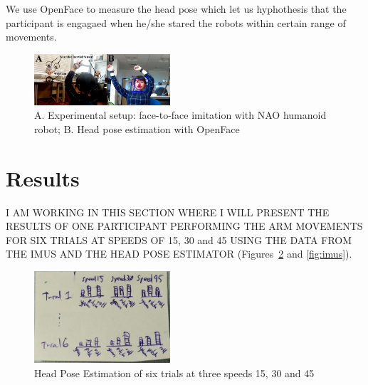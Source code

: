 \documentclass{sigchi}
\begin{document}

We use OpenFace \cite{Baltrusaitis2016} to measure the head pose which
 let us hyphothesis that the participant is engagaed
when he/she stared the robots within certain range of movements.






\begin{figure}[!htb]
\centering
\includegraphics[width=0.45\textwidth]{figures/experiment/fig_w619h233}
\caption[PA]{A. Experimental setup: face-to-face imitation with NAO humanoid robot;
B. Head pose estimation with OpenFace \cite{Baltrusaitis2016}
}
\label{fig:exp}
\end{figure}


\section{Results}
I AM WORKING IN THIS SECTION WHERE I WILL PRESENT THE RESULTS OF
ONE PARTICIPANT PERFORMING THE ARM MOVEMENTS FOR SIX TRIALS
AT SPEEDS OF 15, 30 and 45 USING THE DATA FROM THE IMUS AND THE HEAD POSE
ESTIMATOR (Figures~\ref{fig:hpe} and \ref{fig:imus}).


\begin{figure}[!htb]
\centering
\includegraphics[width=0.45\textwidth]{figures/results/hpe}
\caption[PA]{Head Pose Estimation of six trials at three speeds 15, 30 and 45}
\label{fig:hpe}
\end{figure}
\end{document}
